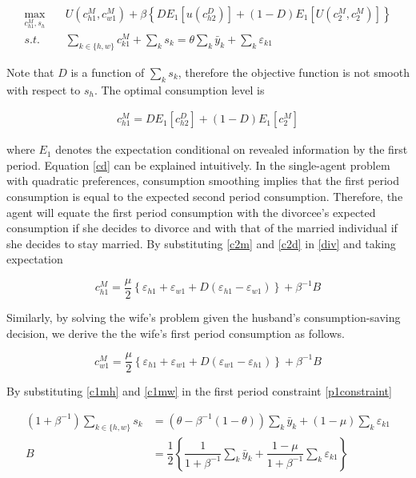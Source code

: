 \begin{align}
\max_{c_{h1}^M, s_h} \quad  &U(c_{h1}^M, c_{w1}^M) + \beta \left \{ D E_1[ u(c^D_{h2})] + (1-D) E_1 [U(c_{2}^M, c_{2}^M)] \right \} \nonumber \\
s.t. &\sum_{k \in \{h,w\}} c^M_{k1} + \sum_k s_k = \theta \sum_k \bar y_k + \sum_k \varepsilon_{k1} \label{p1constraint}
\end{align}

\noindent Note that $D$ is a function of $\sum_k s_k$, therefore the objective function is not smooth with respect to $s_h$. The optimal consumption level is

\begin{align}
c^M_{h1} = D E_1[c^D_{h2}] + (1-D) E_1[c_2^M]  \label{cd}
\end{align}

\noindent where $E_1$ denotes the expectation conditional on revealed information by the first period.  Equation \eqref{cd} can be explained intuitively. In the single-agent problem with quadratic preferences, consumption smoothing implies that the first period consumption is equal to the expected second period consumption. Therefore, the agent will equate the first period consumption with the divorcee's expected consumption if she decides to divorce and with that of the married individual if she decides to stay married.  By substituting \eqref{c2m} and \eqref{c2d}  in \eqref {div} and taking expectation

\begin{equation}
c^M_{h1} = \dfrac{ \mu}{2}   \left \{ \varepsilon_{h1} + \varepsilon_{w1} + D (\varepsilon_{h1} - \varepsilon_{w1})  \right \} + \beta^{-1} B
\label{c1mh}
\end{equation}

\noindent Similarly, by solving the wife's problem given the husband's consumption-saving decision, we derive the the wife's first period consumption as follows. 

\begin{equation}
c^M_{w1} = \dfrac{ \mu}{2}   \left \{ \varepsilon_{h1} + \varepsilon_{w1} + D (\varepsilon_{w1} - \varepsilon_{h1})  \right \} + \beta^{-1} B
\label{c1mw}
\end{equation}

\noindent By substituting \eqref{c1mh} and \eqref{c1mw} in the first period constraint \eqref{p1constraint}

\begin {align}
(1 + \beta^{-1}) \sum_{k \in \{h,w\}} s_k  &=  \left (\theta - \beta^{-1} (1- \theta)  \right ) \sum_k \bar y_k + \left ( 1 - \mu \right ) \sum_k \varepsilon_{k1} \\
B & = \dfrac{1}{2} \left \{ \dfrac {1}{1 + \beta^{-1}}\sum_k \bar y_k + \dfrac{ 1 - \mu}{1 + \beta^{-1}}  \sum_k \varepsilon_{k1} \right \} 
\label {saving}
\end{align}


